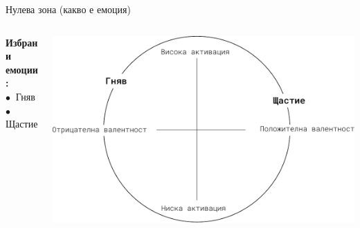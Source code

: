 \documentclass[9pt]{beamer}
\begin{document}
    \begin{frame}{Нулева зона (какво е емоция)}
        \begin{columns}[T] %
            \begin{column}{.38\textwidth}
                \textbf{Избрани емоции:}
                \vspace{1cm}\\
                $\bullet\ $ Гняв
                \vspace{1cm}\\
                $\bullet\ $ Щастие
                \vspace{1cm}\\
                \phantom{$\bullet\ $ Неутрална емоция}
                \vspace{1cm}\\
                \phantom{$\bullet\ $ Тъга}
            \end{column}%
            \hfill%
            \begin{column}{.60\textwidth}
                \vspace{1cm}
                \begin{center}
                    \includegraphics[width=\textwidth]{valence_arousal_ah}%
                \end{center}
            \end{column}%
        \end{columns}
    \end{frame}
\end{document}
